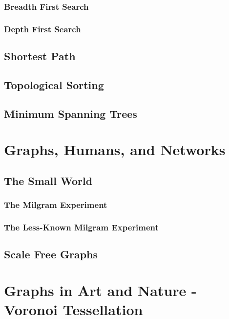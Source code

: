 \documentclass[10pt,a4paper]{book}
\begin{document}
\subsubsection{Breadth First Search}

\subsubsection{Depth First Search}


\subsection{Shortest Path}
\subsection{Topological Sorting}
\subsection{Minimum Spanning Trees}


\section{Graphs, Humans, and Networks}

\subsection{The Small World}
\subsubsection{The Milgram Experiment}
\subsubsection{The Less-Known Milgram Experiment}

\subsection{Scale Free Graphs}


\section{Graphs in Art and Nature - Voronoi Tessellation}
\end{document}
